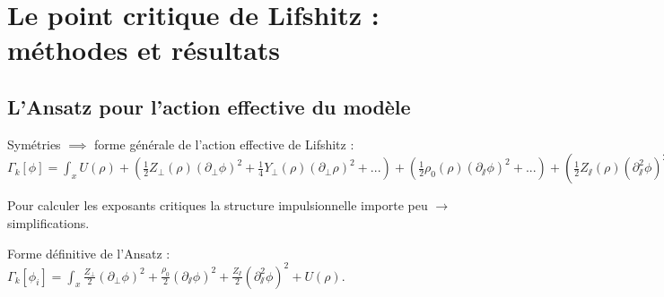 \documentclass[xcolor=dvipsnames]{beamer}
\begin{document}
\section{Le point critique de Lifshitz : méthodes et résultats}
\subsection{L'Ansatz pour l'action effective du modèle}
\begin{frame}

\begin{block}{Symétries $\implies$ forme générale de l'action effective de Lifshitz :}
$\Gamma_k[\phi] = \int_{x} U(\rho) + \left( \frac{1}{2} Z_\perp(\rho) (\partial_\perp \phi)^2 + \frac{1}{4} Y_\perp(\rho) (\partial_\perp \rho)^2 + ... \right) + \left( \frac{1}{2} \rho_0(\rho) (\partial_\sslash \phi)^2 + ... \right) + \left( \frac{1}{2} Z_\sslash(\rho) (\partial_\sslash^2 \phi)^2 + ... \right)$
\end{block}

Pour calculer les exposants critiques la structure impulsionnelle importe peu $\rightarrow$ simplifications.

\begin{block}{Forme définitive de l'Ansatz :}
$\Gamma_k[\phi_i] = \int_x  \frac{Z_\perp}{2} (\partial_\perp \phi)^2 + \frac{\rho_0}{2} (\partial_\sslash \phi)^2 + \frac{Z_\sslash}{2} (\partial_\sslash^2 \phi)^2 + U(\rho).$
\end{block}
\end{frame}
\end{document}
